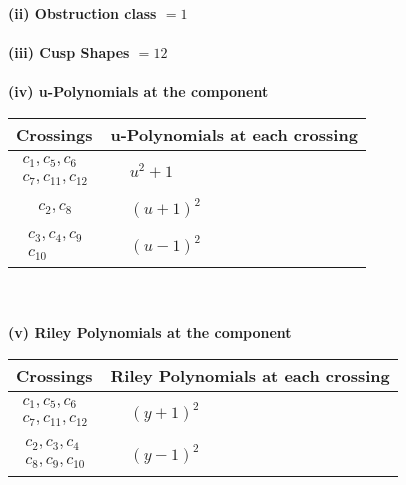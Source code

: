 \documentclass[1p]{elsarticle_modified}
\theoremstyle{definition}
\begin{document}
\flushleft \textbf{(ii) Obstruction class $= 1$}\\~\\
\flushleft \textbf{(iii) Cusp Shapes $= 12$}\\~\\
\newpage\renewcommand{\arraystretch}{1}
\flushleft \textbf{(iv) u-Polynomials at the component}\newline \\
\begin{tabular}{m{50pt}|m{274pt}}
Crossings & \hspace{64pt}u-Polynomials at each crossing \\
\hline $$\begin{aligned}c_{1},c_{5},c_{6}\\c_{7},c_{11},c_{12}\end{aligned}$$&$\begin{aligned}
&u^2+1
\end{aligned}$\\
\hline $$\begin{aligned}c_{2},c_{8}\end{aligned}$$&$\begin{aligned}
&(u+1)^2
\end{aligned}$\\
\hline $$\begin{aligned}c_{3},c_{4},c_{9}\\c_{10}\end{aligned}$$&$\begin{aligned}
&(u-1)^2
\end{aligned}$\\
\hline
\end{tabular}\\~\\
\newpage\renewcommand{\arraystretch}{1}
\flushleft \textbf{(v) Riley Polynomials at the component}\newline \\
\begin{tabular}{m{50pt}|m{274pt}}
Crossings & \hspace{64pt}Riley Polynomials at each crossing \\
\hline $$\begin{aligned}c_{1},c_{5},c_{6}\\c_{7},c_{11},c_{12}\end{aligned}$$&$\begin{aligned}
&(y+1)^2
\end{aligned}$\\
\hline $$\begin{aligned}c_{2},c_{3},c_{4}\\c_{8},c_{9},c_{10}\end{aligned}$$&$\begin{aligned}
&(y-1)^2
\end{aligned}$\\
\hline
\end{tabular}\\~\\
\end{document}
